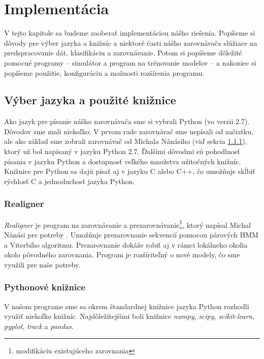 \chapter{Implementácia}

V tejto kapitole sa budeme zaoberať implementáciou nášho riešenia. Popíšeme si dôvody pre výber jazyka a knižníc a niektoré časti nášho zarovnávača slúžiace na predspracovanie dát, klasifikáciu a zarovnávanie. Potom si popíšeme dôležité pomocné programy -- simulátor a program na trénovanie modelov -- a nakoniec si popíšeme použitie, konfiguráciu a možnosti rozšírenia programu.

\section{Výber jazyka a použité knižnice}
Ako jazyk pre písanie nášho zarovnávača sme si vybrali Python (vo verzii 2.7). Dôvodov sme mali niekoľko: V prvom rade zarovnávač sme nepísali od začiatku, ale ako základ sme zobrali zarovnávač od Michala Nánásiho (viď sekcia \ref{subsec:realigner}), ktorý už bol napísaný v jazyku Python 2.7. Ďalšími dôvodmi sú pohodlnosť písania v jazyku Python a dostupnosť veľkého množstva užitočných knižníc. Knižnice pre Python sa dajú písať aj v jazyku C alebo C++, čo umožňuje skĺbiť rýchlosť C a jednoduchosť jazyka Python.

\subsection{Realigner}
\label{subsec:realigner}

\textit{Realigner} je program na zarovnávanie a prezarovnávanie\footnote{modifikáciu existujúceho zarovnania}, ktorý napísal Michal Nánási pre potreby \cite{nanasi2013probabilistic}. Umožňuje prezarovnanie sekvencií pomocou párových HMM a Viterbiho algoritmu. Prezarovnanie dokáže robiť aj v rámci lokálneho okolia okolo pôvodného zarovnania. Program je rozšíriteľný o nové modely, čo sme využili pre naše potreby.

\subsection{Pythonové knižnice}
V našom programe sme sa okrem štandardnej knižnice jazyka Python rozhodli využiť niekoľko knižníc. Najdôležitejšími boli knižnice \textit{numpy}, \textit{scipy}, \textit{scikit-learn}, \textit{pyplot}, \textit{track} a \textit{pandas}.

